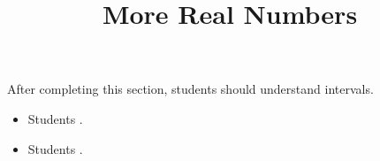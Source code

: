 \documentclass{ximera}
\title{More Real Numbers}
\begin{document}
\begin{abstract}
\end{abstract}

\maketitle

\begin{sectionOutcomes}

After completing this section, students should understand intervals. 

\begin{itemize}
\item Students .
\item Students .
\end{itemize}

\end{sectionOutcomes}
\end{document}
